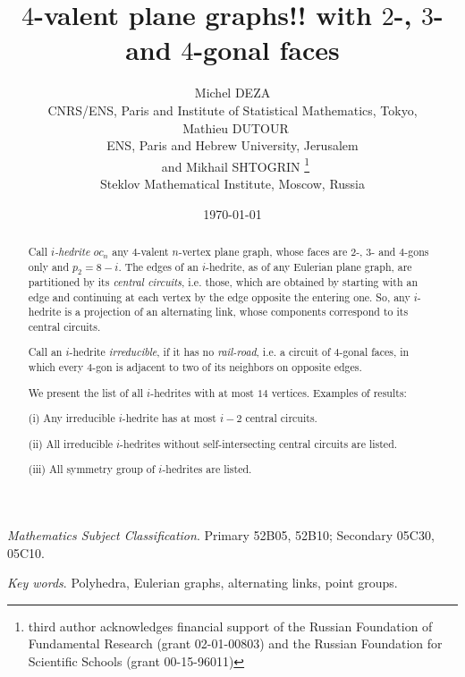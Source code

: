 \documentclass[12pt]{article}
\begin{document}
\title{$4$-valent plane graphs!! with $2$-, $3$- and $4$-gonal faces}


\author{Michel DEZA \\
  CNRS/ENS, Paris and Institute of Statistical Mathematics, 
Tokyo,\\
\ Mathieu DUTOUR \\
 ENS, Paris and Hebrew University, Jerusalem\\
\ and  Mikhail SHTOGRIN \thanks{third author acknowledges financial support 
of the Russian Foundation of Fundamental Research (grant 02-01-00803)
and the Russian Foundation for Scientific Schools (grant 00-15-96011)}\\
Steklov Mathematical Institute, Moscow, Russia} 
\date{\today}

\maketitle



\begin{abstract}
Call {\em $i$-hedrite $oc_n$} any $4$-valent $n$-vertex plane graph, whose 
faces are $2$-, $3$- and $4$-gons only and $p_2=8-i$. The edges of an $i$-hedrite, as of 
any Eulerian plane graph, are partitioned
by its {\em central circuits}, i.e. those, which are obtained by starting with an
edge and continuing at each vertex by the edge opposite the entering one. 
So, any $i$-hedrite is a projection of an alternating link, whose components
correspond to its central circuits.

Call an $i$-hedrite {\em irreducible}, if it has no 
{\em rail-road}, i.e. a 
circuit of $4$-gonal faces, in which every $4$-gon is adjacent to two of its 
neighbors on opposite edges.

We present the list of all $i$-hedrites with at most $14$ vertices. Examples of results: 

(i) Any irreducible $i$-hedrite has at most $i-2$ central circuits.

(ii) All irreducible $i$-hedrites without self-intersecting central circuits are listed.

(iii) All symmetry group of $i$-hedrites are listed.

\end{abstract}

{\em Mathematics Subject Classification}. Primary 52B05, 52B10;
Secondary 05C30, 05C10.

{\em Key words}. Polyhedra, Eulerian graphs, alternating links, point groups.
\end{document}
